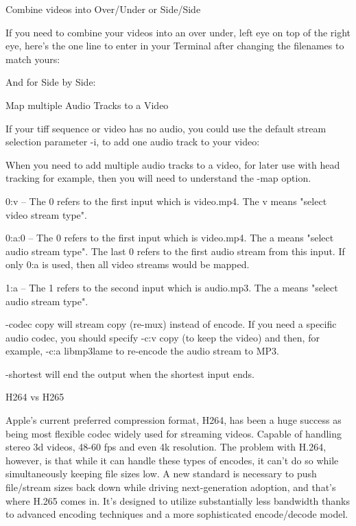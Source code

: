 \begin{fullwidth}
{\large Combine videos into Over/Under or Side/Side \par}

If you need to combine your videos into an over under, left eye on top of the right eye, here’s the one line to enter in your Terminal after changing the filenames to match yours:


And for Side by Side:



{\large Map multiple Audio Tracks to a Video \par}

If your tiff sequence or video has no audio, you could use the default stream selection parameter -i, to add one audio track to your video: 


When you need to add multiple audio tracks to a video, for later use with head tracking for example, then you will need to understand the -map option.


0:v – The 0 refers to the first input which is video.mp4. The v means "select video stream type".

0:a:0 – The 0 refers to the first input which is video.mp4. The a means "select audio stream type". The last 0 refers to the first audio stream from this input. If only 0:a is used, then all video streams would be mapped.

1:a – The 1 refers to the second input which is audio.mp3. The a means "select audio stream type".

-codec copy will stream copy (re-mux) instead of encode. If you need a specific audio codec, you should specify -c:v copy (to keep the video) and then, for example, -c:a libmp3lame to re-encode the audio stream to MP3.

-shortest will end the output when the shortest input ends.

{\large H264 vs H265 \par}

Apple’s current preferred compression format, H264, has been a huge success as being most flexible codec widely used for streaming videos. Capable of handling stereo 3d videos, 48-60 fps and even 4k resolution.  The problem with H.264, however, is that while it can handle these types of encodes, it can’t do so while simultaneously keeping file sizes low. A new standard is necessary to push file/stream sizes back down while driving next-generation adoption, and that’s where H.265 comes in. It’s designed to utilize substantially less bandwidth thanks to advanced encoding techniques and a more sophisticated encode/decode model.


\end{fullwidth}
